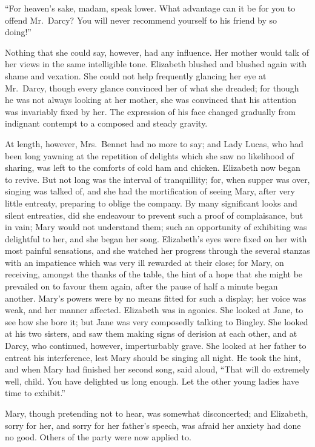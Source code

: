 \documentclass[12pt,english,oneside]{book}
\begin{document}
{}``For heaven's sake, madam, speak lower. What advantage can it
be for you to offend Mr.\ Darcy? You will never recommend yourself
to his friend by so doing!''\ 

Nothing that she could say, however, had any influence. Her mother
would talk of her views in the same intelligible tone. Elizabeth blushed
and blushed again with shame and vexation. She could not help frequently
glancing her eye at Mr.\ Darcy, though every glance convinced her
of what she dreaded; for though he was not always looking at her mother,
she was convinced that his attention was invariably fixed by her.
The expression of his face changed gradually from indignant contempt
to a composed and steady gravity.

At length, however, Mrs.\ Bennet had no more to say; and Lady Lucas,
who had been long yawning at the repetition of delights which she
saw no likelihood of sharing, was left to the comforts of cold ham
and chicken. Elizabeth now began to revive. But not long was the interval
of tranquillity; for, when supper was over, singing was talked of,
and she had the mortification of seeing Mary, after very little entreaty,
preparing to oblige the company. By many significant looks and silent
entreaties, did she endeavour to prevent such a proof of complaisance,
but in vain; Mary would not understand them; such an opportunity of
exhibiting was delightful to her, and she began her song. Elizabeth's
eyes were fixed on her with most painful sensations, and she watched
her progress through the several stanzas with an impatience which
was very ill rewarded at their close; for Mary, on receiving, amongst
the thanks of the table, the hint of a hope that she might be prevailed
on to favour them again, after the pause of half a minute began another.
Mary's powers were by no means fitted for such a display; her voice
was weak, and her manner affected. Elizabeth was in agonies. She looked
at Jane, to see how she bore it; but Jane was very composedly talking
to Bingley. She looked at his two sisters, and saw them making signs
of derision at each other, and at Darcy, who continued, however, imperturbably
grave. She looked at her father to entreat his interference, lest
Mary should be singing all night. He took the hint, and when Mary
had finished her second song, said aloud, {}``That will do extremely
well, child. You have delighted us long enough. Let the other young
ladies have time to exhibit.''

Mary, though pretending not to hear, was somewhat disconcerted; and
Elizabeth, sorry for her, and sorry for her father's speech, was afraid
her anxiety had done no good. Others of the party were now applied
to.
\end{document}
